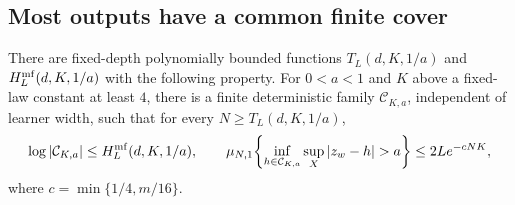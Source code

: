 \subsection{Most outputs have a common finite cover}
\begin{proposition}\label{prop:mf-cover}
There are fixed-depth polynomially bounded functions
$T_L(d,K,1/a)$ and $H_L^{\rm mf}(d,K,1/a)$ with the following
property. For $0<a<1$ and $K$ above a fixed-law constant at least $4$,
there is a finite deterministic family $\mathcal C_{K,a}$, independent
of learner width, such that for every $N\geq T_L(d,K,1/a)$,
\[
 \log|\mathcal C_{K,a}|\leq H_L^{\rm mf}(d,K,1/a),
 \qquad
 \mu_{N,1}\!\left\{\inf_{h\in\mathcal C_{K,a}}\sup_X|z_w-h|>a\right\}
 \leq2Le^{-cNK},
\]
where $c=\min\{1/4,m/16\}$.
\end{proposition}

